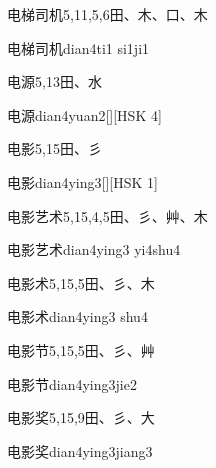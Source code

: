\begin{entry}{电梯司机}{5,11,5,6}{⽥、⽊、⼝、⽊}
  \begin{phonetics}{电梯司机}{dian4ti1 si1ji1}
  \end{phonetics}
\end{entry}

\begin{entry}{电源}{5,13}{⽥、⽔}
  \begin{phonetics}{电源}{dian4yuan2}[][HSK 4]
  \end{phonetics}
\end{entry}

\begin{entry}{电影}{5,15}{⽥、⼺}
  \begin{phonetics}{电影}{dian4ying3}[][HSK 1]
  \end{phonetics}
\end{entry}

\begin{entry}{电影艺术}{5,15,4,5}{⽥、⼺、⾋、⽊}
  \begin{phonetics}{电影艺术}{dian4ying3 yi4shu4}
  \end{phonetics}
\end{entry}

\begin{entry}{电影术}{5,15,5}{⽥、⼺、⽊}
  \begin{phonetics}{电影术}{dian4ying3 shu4}
  \end{phonetics}
\end{entry}

\begin{entry}{电影节}{5,15,5}{⽥、⼺、⾋}
  \begin{phonetics}{电影节}{dian4ying3jie2}
  \end{phonetics}
\end{entry}

\begin{entry}{电影奖}{5,15,9}{⽥、⼺、⼤}
  \begin{phonetics}{电影奖}{dian4ying3jiang3}
  \end{phonetics}
\end{entry}

